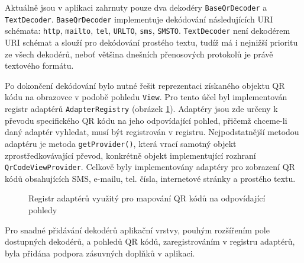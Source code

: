 Aktuálně jsou v aplikaci zahrnuty pouze dva dekodéry
\texttt{BaseQrDecoder} a \texttt{TextDecoder}. \texttt{BaseQrDecoder}
implementuje dekódování následujících URI schémata: \texttt{http},
\texttt{mailto}, \texttt{tel}, \texttt{URLTO}, \texttt{sms}, \texttt{SMSTO}.
\texttt{TextDecoder} není dekodérem URI schémat a slouží pro dekódování prostého
textu, tudíž má i nejnižší prioritu ze všech dekodérů, neboť většina dnešních
přenosových protokolů je právě textového formátu.

Po dokončení dekódování bylo nutné řešit reprezentaci získaného objektu QR kódu
na obrazovce v podobě pohledu \texttt{View}. Pro tento účel byl implementován
registr adaptérů \texttt{AdapterRegistry} (obrázek \ref{adapterPattern}). Adaptéry jsou
zde určeny k převodu specifického QR kódu na jeho odpovídající pohled, přičemž chceme-li daný
adaptér vyhledat, musí být registrován v registru. Nejpodstatnější metodou
adaptéru je metoda \texttt{getProvider()}, která vrací samotný objekt
zprostředkovávající převod, konkrétně objekt implementující rozhraní
\texttt{QrCodeViewProvider}. Celkově byly implementovány adaptéry pro zobrazení
QR kódů obsahujících SMS, e-mailu, tel. čísla, internetové stránky a prostého textu.
 
 \begin{figure}[H]
  \begin{center}
    \caption{Registr adaptérů využitý pro mapování QR kódů na odpovídající
    pohledy}
    \label{adapterPattern}
  \end{center}
\end{figure}
 
Pro snadné přidávání dekodérů aplikační vrstvy, pouhým rozšířením pole
dostupných dekodérů, a pohledů QR kódů, zaregistrováním v registru adaptérů,
byla přidána podpora zásuvných doplňků v aplikaci.

